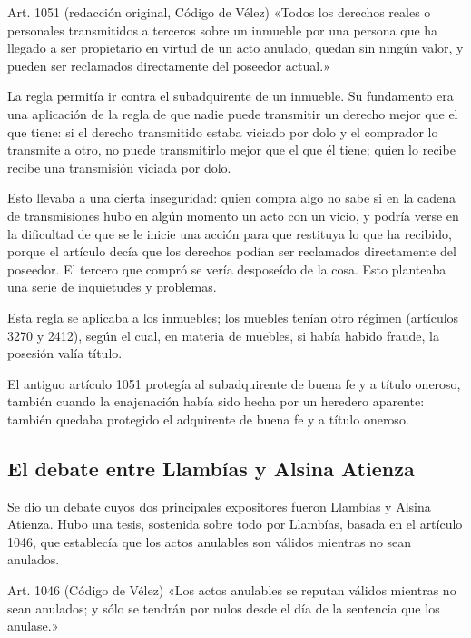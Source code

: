 \documentclass[12pt,oneside]{book}
\begin{document}
\begin{articulo}{Art. 1051 (redacción original, Código de Vélez)}
«Todos los derechos reales o personales transmitidos a terceros sobre un inmueble por una persona que ha llegado a ser propietario en virtud de un acto anulado, quedan sin ningún valor, y pueden ser reclamados directamente del poseedor actual.»
\end{articulo}

La regla permitía ir contra el subadquirente de un inmueble. Su fundamento era una aplicación de la regla de que nadie puede transmitir un derecho mejor que el que tiene: si el derecho transmitido estaba viciado por dolo y el comprador lo transmite a otro, no puede transmitirlo mejor que el que él tiene; quien lo recibe recibe una transmisión viciada por dolo.

Esto llevaba a una cierta inseguridad: quien compra algo no sabe si en la cadena de transmisiones hubo en algún momento un acto con un vicio, y podría verse en la dificultad de que se le inicie una acción para que restituya lo que ha recibido, porque el artículo decía que los derechos podían ser reclamados directamente del poseedor. El tercero que compró se vería desposeído de la cosa. Esto planteaba una serie de inquietudes y problemas.

Esta regla se aplicaba a los inmuebles; los muebles tenían otro régimen (artículos 3270 y 2412), según el cual, en materia de muebles, si había habido fraude, la posesión valía título.

El antiguo artículo 1051 protegía al subadquirente de buena fe y a título oneroso, también cuando la enajenación había sido hecha por un heredero aparente: también quedaba protegido el adquirente de buena fe y a título oneroso.

\subsection*{El debate entre Llambías y Alsina Atienza}

Se dio un debate cuyos dos principales expositores fueron Llambías y Alsina Atienza. Hubo una tesis, sostenida sobre todo por Llambías, basada en el artículo 1046, que establecía que los actos anulables son válidos mientras no sean anulados.

\begin{articulo}{Art. 1046 (Código de Vélez)}
«Los actos anulables se reputan válidos mientras no sean anulados; y sólo se tendrán por nulos desde el día de la sentencia que los anulase.»
\end{articulo}
\end{document}
